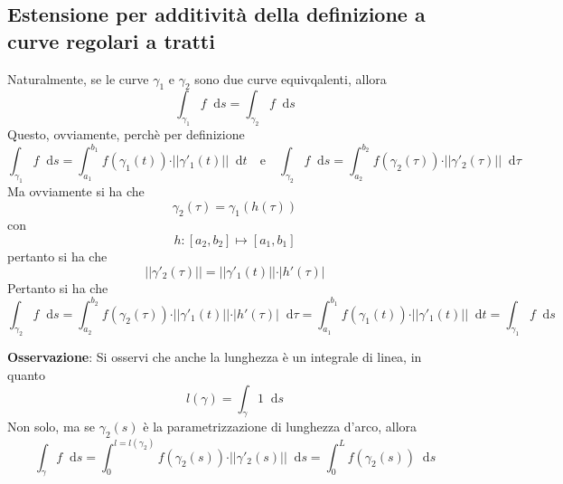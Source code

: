 \documentclass[a4paper]{extarticle}
\newcommand*\dif{\mathop{}\!\mathrm{d}}
\begin{document}
\vspace{1em}
\noindent
\subsection{Estensione per additività della definizione a curve regolari a tratti}
Naturalmente, se le curve $\gamma_1$ e $\gamma_2$ sono due curve equivqalenti, allora
\[\int_{\gamma_1} f \dif s = \int_{\gamma_2} f \dif s\]
Questo, ovviamente, perchè per definizione
\[\int_{\gamma_1} f \dif s = \int_{a_1}^{b_1} f(\gamma_1(t)) \cdot \vert\vert\gamma'_1(t)\vert\vert \dif t \hspace{1em} \text{e} \hspace{1em} \int_{\gamma_2} f \dif s = \int_{a_2}^{b_2} f(\gamma_2(\tau)) \cdot \vert\vert\gamma'_2(\tau)\vert\vert \dif \tau \]
Ma ovviamente si ha che
\[\gamma_2(\tau)=\gamma_1(h(\tau))\]
con
\[h : [a_2,b_2] \longmapsto [a_1,b_1]\]
pertanto si ha che
\[\vert\vert \gamma'_2(\tau) \vert\vert=\vert\vert\gamma'_1(t)\vert\vert \cdot \vert h'(\tau) \vert\]
Pertanto si ha che
\[\int_{\gamma_2} f \dif s = \int_{a_2}^{b_2} f(\gamma_2(\tau)) \cdot \vert\vert\gamma'_1(t)\vert\vert \cdot \vert h'(\tau) \vert \dif \tau = \int_{a_1}^{b_1} f(\gamma_1(t)) \cdot \vert\vert\gamma'_1(t)\vert\vert \dif t = \int_{\gamma_1} f \dif s\]

\vspace{2em}
\noindent
\textbf{Osservazione}: Si osservi che anche la lunghezza è un integrale di linea, in quanto
\[l(\gamma) = \int_\gamma 1 \dif s\]
Non solo, ma se $\gamma_2(s)$ è la parametrizzazione di lunghezza d'arco, allora
\[\int_\gamma f \dif s = \int_0^{l=l(\gamma_2)} f(\gamma_2(s)) \cdot \vert\vert\gamma'_2(s)\vert\vert\dif s = \int_0^L f(\gamma_2(s)) \dif s\]
\end{document}
